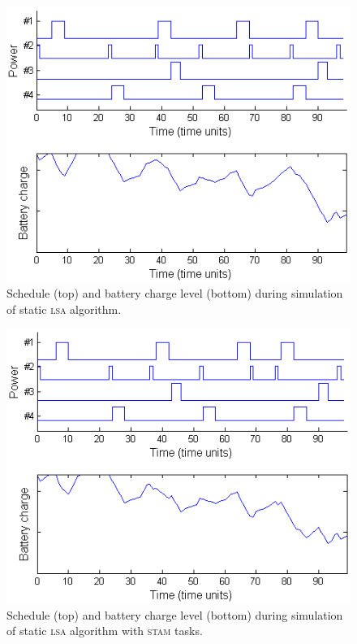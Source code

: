\begin{figure}[tb]
\begin{center}
\includegraphics[scale=0.57]{lsabattery.png}
\caption{Schedule (top) and battery charge level (bottom) during simulation of static \textsc{lsa} algorithm.\label{fig:lsabattery}}
\end{center}
\end{figure}

\begin{figure}[tb]
\begin{center}
\includegraphics[scale=0.57]{lsastambattery.png}
\caption{Schedule (top) and battery charge level (bottom) during simulation of static \textsc{lsa} algorithm with \textsc{stam} tasks.\label{fig:lsastambattery}}
\end{center}
\end{figure}

